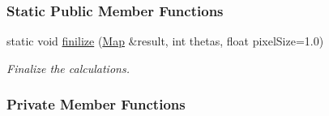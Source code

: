 \subsubsection*{Static Public Member Functions}
\begin{DoxyCompactItemize}
\item 
static void \hyperlink{classCTrec_abc505913072c98451777f51e8f6538e5}{finilize} (\hyperlink{group__Types_ga8747378c016fc11d9ecbb98787248c25}{Map} \&result, int thetas, float pixelSize=1.0)
\begin{DoxyCompactList}\small\item\em Finalize the calculations. \item\end{DoxyCompactList}\end{DoxyCompactItemize}
\subsubsection*{Private Member Functions}
